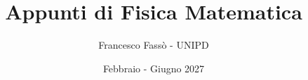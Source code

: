 \documentclass[11pt]{scrartcl}
\begin{document}
	\title{Appunti di Fisica Matematica}
	\subtitle{Francesco Fassò - UNIPD}
	\date{Febbraio - Giugno 2027}
	
	\maketitle
	
	\tableofcontents
	
	\newpage
	
\end{document}

